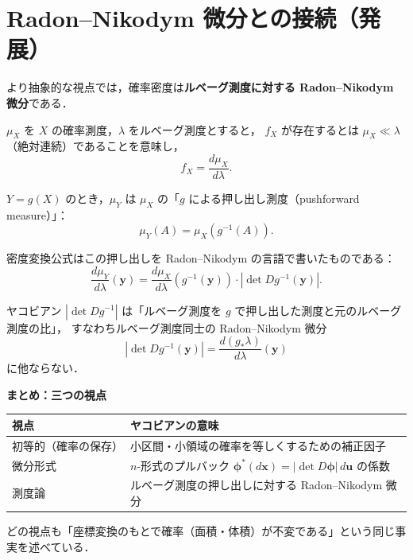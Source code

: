 \documentclass[lualatex,ja=standard,a4paper,12pt]{bxjsarticle}
\begin{document}
\section{Radon--Nikodym 微分との接続（発展）}

より抽象的な視点では，確率密度は\textbf{ルベーグ測度に対する Radon--Nikodym 微分}である．

$\mu_X$ を $X$ の確率測度，$\lambda$ をルベーグ測度とすると，
$f_X$ が存在するとは $\mu_X \ll \lambda$（絶対連続）であることを意味し，
\[
  f_X = \frac{d\mu_X}{d\lambda}.
\]

$Y = g(X)$ のとき，$\mu_Y$ は $\mu_X$ の「$g$ による押し出し測度（pushforward measure）」：
\[
  \mu_Y(A) = \mu_X(g^{-1}(A)).
\]

密度変換公式はこの押し出しを Radon--Nikodym の言語で書いたものである：
\[
  \frac{d\mu_Y}{d\lambda}(\mathbf{y})
  = \frac{d\mu_X}{d\lambda}(g^{-1}(\mathbf{y})) \cdot \left|\det D g^{-1}(\mathbf{y})\right|.
\]

ヤコビアン $|\det D g^{-1}|$ は「ルベーグ測度を $g$ で押し出した測度と元のルベーグ測度の比」，
すなわちルベーグ測度同士の Radon--Nikodym 微分
\[
  \left|\det D g^{-1}(\mathbf{y})\right| = \frac{d(g_*\lambda)}{d\lambda}(\mathbf{y})
\]
に他ならない．

\begin{pointbox}
\textbf{まとめ：三つの視点}
\begin{center}
\renewcommand{\arraystretch}{1.5}
\begin{tabular}{lp{9cm}}
\toprule
\textbf{視点} & \textbf{ヤコビアンの意味} \\
\midrule
初等的（確率の保存） &
  小区間・小領域の確率を等しくするための補正因子 \\
微分形式 &
  $n$-形式のプルバック $\boldsymbol{\phi}^*(d\mathbf{x}) = |\det D\boldsymbol{\phi}|\,d\mathbf{u}$ の係数 \\
測度論 &
  ルベーグ測度の押し出しに対する Radon--Nikodym 微分 \\
\bottomrule
\end{tabular}
\end{center}
どの視点も「座標変換のもとで確率（面積・体積）が不変である」という同じ事実を述べている．
\end{pointbox}
\end{document}
